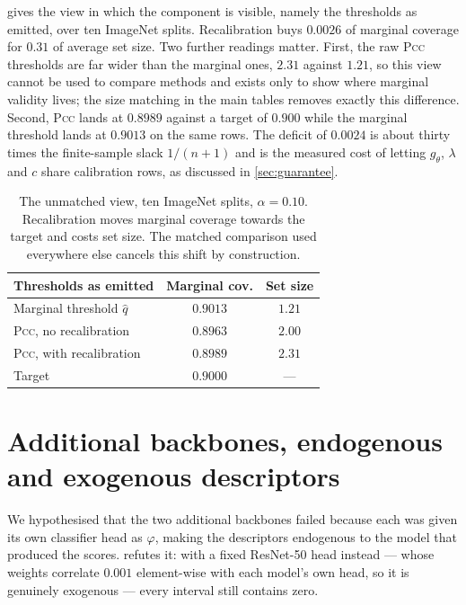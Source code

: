  gives the view in which the component is visible, namely the thresholds as
emitted, over ten ImageNet splits. Recalibration buys $0.0026$ of marginal coverage for $0.31$
of average set size. Two further readings matter. First, the raw \textsc{Pcc} thresholds are far
wider than the marginal ones, $2.31$ against $1.21$, so this view cannot be used to compare
methods and exists only to show where marginal validity lives; the size matching in the main
tables removes exactly this difference. Second, \textsc{Pcc} lands at $0.8989$ against a target
of $0.900$ while the marginal threshold lands at $0.9013$ on the same rows. The deficit of
$0.0024$ is about thirty times the finite-sample slack $1/(n+1)$ and is the measured cost of
letting $g_\theta$, $\lambda$ and $c$ share calibration rows, as discussed in
\cref{sec:guarantee}.

\begin{table}[h]
\centering
\small
\setlength{\tabcolsep}{4pt}
\begin{tabular}{lcc}
\toprule
Thresholds as emitted & Marginal cov. & Set size \\
\midrule
Marginal threshold $\hat q$        & $0.9013$ & $1.21$ \\
\textsc{Pcc}, no recalibration     & $0.8963$ & $2.00$ \\
\textsc{Pcc}, with recalibration   & $0.8989$ & $2.31$ \\
\midrule
Target                             & $0.9000$ & --- \\
\bottomrule
\end{tabular}
\caption{The unmatched view, ten ImageNet splits, $\alpha=0.10$. Recalibration moves marginal
coverage towards the target and costs set size. The matched comparison used everywhere else
cancels this shift by construction.}
\label{tab:invisible}
\end{table}

\section{Additional backbones, endogenous and exogenous descriptors}
\label{app:backbones}

We hypothesised that the two additional backbones failed because each was given its own
classifier head as $\varphi$, making the descriptors endogenous to the model that produced the
scores.  refutes it: with a fixed ResNet-50 head instead --- whose weights
correlate $0.001$ element-wise with each model's own head, so it is genuinely exogenous ---
every interval still contains zero.

